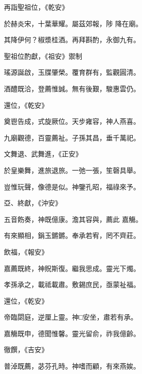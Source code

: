 \begin{pinyinscope}
 再詣聖祖位，《乾安》



 於赫炎宋，十葉華耀。屬茲郊報，陟
 降在廟。



 其降伊何？椒漿桂酒。再拜斟酌，永御九有。



 聖祖位酌獻，《祖安》禦制



 瑤源誕啟，玉牒肇榮。覆育群有，監觀圓清。



 酒醴既洽，登薦惟誠。無有後艱，駿惠雲仍。



 還位，《乾安》



 奠鬯告成，式旋厥位。天步雍容，神人燕喜。



 九廟觀德，百靈薦祉。子孫其昌，垂千萬祀。



 文舞退、武舞進，《正安》



 於皇樂舞，進旅退旅。一弛一張，笙磬具舉。



 豈惟玩聲，像德是似。神鑒孔昭，福祿來予。



 亞、終獻，《沖安》



 五音飭奏，神既億康。澹其容與，薦此
 嘉觴。



 有來顯相，鋗玉鏘鏘。奉承若宥，罔不齊莊。



 飲福，《報安》



 嘉薦既終，神貺斯復。繼我思成。靈光下燭。



 孝孫承之，載祗載肅。敷錫庶民，亟蒙祉福。



 還位，《乾安》



 帝臨閟庭，逆厘上靈。神□安坐，肅若有承。



 嘉觴既申，德聞惟馨。靈光留俞，祚我億齡。



 徹饌，《吉安》



 普淖既薦，苾芬孔時。神嗜而顧，有來燕娭。




\end{pinyinscope}
